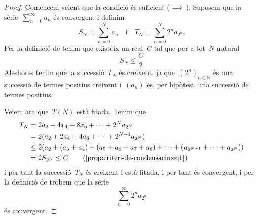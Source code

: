 \documentclass[../analisi-matematica.tex]{subfiles}
\begin{document}
    \begin{proof}
        Comencem veient que la condició és suficient (\(\implies\)).
        Suposem que la sèrie~\(\sum_{n=0}^{\infty}a_{n}\) és convergent i definim
        \[
            S_{N}=\sum_{n=0}^{N}a_{n}\quad\text{i}\quad T_{N}=\sum_{n=0}^{N}2^{n}a_{2^{n}}.
        \]
        Per la definició de  tenim que existeix un real~\(C\) tal que per a tot~\(N\) natural
        \begin{equation}
            \label{prop:criteri-de-condensacio:eq1}
            S_{N}\leq\frac{C}{2}
        \end{equation}
        Aleshores tenim que la successió~\(T_{N}\) és creixent, ja que~\((2^{n})_{n\in\mathbb{N}}\) és una successió de termes positius creixent i~\((a_{n})\) és, per hipòtesi, una successió de termes positius.

        Veiem ara que~\(T(N)\) està fitada.
        Tenim que
        \begin{align*}
            T_{N}&=2a_{2}+4x_{4}+8x_{6}+\dots+2^{N}a_{2^{N}} \\
            &=2(a_{2}+2a_{4}+4a_{6}+\dots+2^{N-1}a_{2^{N}}) \\
            &\leq2\left(a_{2}+(a_{3}+a_{4})+(a_{5}+a_{6}+a_{7}+a_{8})+\dots+(a_{2^{N-1}}+\dots+a_{2^{N}})\right) \\
            &=2S_{2^{N}}\leq C \tag{\ref{prop:criteri-de-condensacio:eq1}}
        \end{align*}
        i per tant la successió~\(T_{N}\) és creixent i està fitada, i per tant és convergent, i per la definició de  trobem que la sèrie
        \[
            \sum_{n=0}^{\infty}2^{n}a_{2^{n}}
        \]
        és convergent.


\end{proof}
\end{document}
